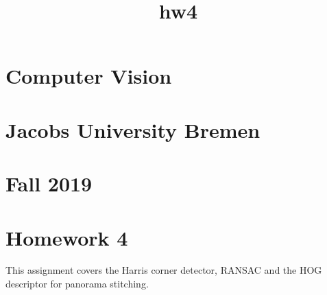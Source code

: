 \documentclass[11pt]{article}
\title{hw4}
\begin{document}
    
    
    \maketitle
    
    

    
    \hypertarget{computer-vision}{%
\section{Computer Vision}\label{computer-vision}}

\hypertarget{jacobs-university-bremen}{%
\section{Jacobs University Bremen}\label{jacobs-university-bremen}}

\hypertarget{fall-2019}{%
\section{Fall 2019}\label{fall-2019}}

\hypertarget{homework-4}{%
\section{Homework 4}\label{homework-4}}

This assignment covers the Harris corner detector, RANSAC and the HOG
descriptor for panorama stitching.
\end{document}
